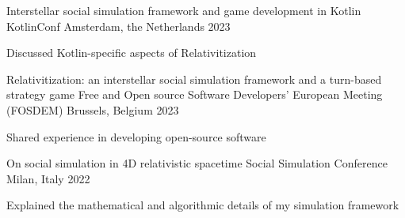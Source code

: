 

\begin{cventries}

  \cventry
    {Interstellar social simulation framework and game development in Kotlin} %
    {KotlinConf} %
    {Amsterdam, the Netherlands} %
    {2023} %
    {
      \begin{cvitems} %
        \item {Discussed Kotlin-specific aspects of Relativitization}
      \end{cvitems}
    }


  \cventry
    {Relativitization: an interstellar social simulation framework and a turn-based strategy game} %
    {Free and Open source Software Developers' European Meeting (FOSDEM)} %
    {Brussels, Belgium} %
    {2023} %
    {
      \begin{cvitems} %
        \item {Shared experience in developing open-source software}
      \end{cvitems}
    }

  \cventry
    {On social simulation in 4D relativistic spacetime} %
    {Social Simulation Conference} %
    {Milan, Italy} %
    {2022} %
    {
      \begin{cvitems} %
        \item {Explained the mathematical and algorithmic details of my simulation framework}
      \end{cvitems}
    }


\end{cventries}
